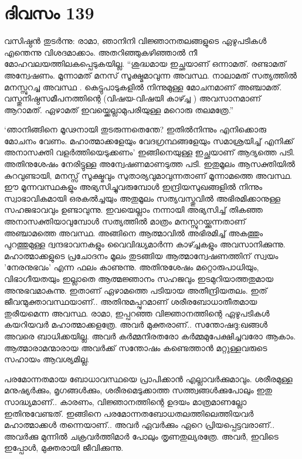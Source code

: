  
\section{ദിവസം 139}


വസിഷ്ഠൻ തുടർന്നു: രാമാ, ഞാനിനി വിജ്ഞാനതലങ്ങളുടെ ഏഴുപടികൾ എന്തെന്നു വിശദമാക്കാം. അതറിഞ്ഞുകഴിഞ്ഞാൽ നീ മോഹവലയത്തിലകപ്പെടുകയില്ല. “ശുദ്ധമായ ഇച്ഛയാണ്‌ ഒന്നാമത്. രണ്ടാമത് അന്വേഷണം. മൂന്നാമത് മനസ് സൂക്ഷ്മമാവുന്ന അവസ്ഥ. നാലാമത് സത്യത്തിൽ മനസ്സുറച്ച അവസ്ഥ . കെട്ടുപാടുകളിൽ നിന്നുമുള്ള മോചനമാണ്‌ അഞ്ചാമത്. വസ്തുനിഷ്ഠസമീപനത്തിന്റെ (വിഷയ-വിഷയി കാഴ്ച്ച ) അവസാനമാണ്‌ ആറാമത്. ഏഴാമത് ഇവയ്ക്കെല്ലാമുപരിയുള്ള മറൊരു തലമത്രേ.”

‘ഞാനിങ്ങിനെ മൂഢനായി തുടരുന്നതെന്തേ? ഇതില്‍നിന്നും എനിക്കൊരു മോചനം വേണം. മഹാത്മാക്കളേയും വേദഗ്രന്ഥങ്ങളേയും സമാശ്രയിച്ച് എനിക്ക് അനാസക്തി വളർത്തിയെടുക്കണം’ ഇങ്ങിനെയുള്ള ഇച്ഛയാണ്‌ ആദ്യത്തെ പടി. അതിനുശേഷം നേരിട്ടുള്ള അന്വേഷണമാണടുത്ത പടി. ഇതുമൂലം ആസക്തിയിൽ കുറവുണ്ടായി, മനസ്സ് സൂക്ഷ്മവും സുതാര്യവുമാവുന്നതാണ്‌ മൂന്നാമത്തെ അവസ്ഥ. ഈ മൂന്നവസ്ഥകളും അഭ്യസിച്ചുവരുമ്പോൾ ഇന്ദ്രിയസുഖങ്ങളിൽ നിന്നും സ്വാഭാവികമായി ഒരകൽച്ചയും അതുമൂലം സത്യവസ്തുവിൽ അഭിരമിക്കാനുള്ള സഹജഭാവവും ഉണ്ടാവുന്നു. ഇവയെല്ലാം നന്നായി അഭ്യസിച്ച് തികഞ്ഞ അനാസക്തിയാവുമ്പോൾ സത്യത്തിൽ മാത്രം മനസ്സുറയ്ക്കുന്നതാണ്‌ അഞ്ചാമത്തെ അവസ്ഥ. അങ്ങിനെ ആത്മാവിൽ അഭിരമിച്ച് അകത്തും പുറത്തുമുള്ള ദ്വന്ദഭാവനകളും വൈവിദ്ധ്യമാര്‍ന്ന  കാഴ്ച്ചകളും അവസാനിക്കുന്നു. മഹാത്മാക്കളുടെ പ്രചോദനം മൂലം തുടങ്ങിയ ആത്മാന്വേഷണത്തിന്‌ സ്വയം 'നേരനുഭവം' എന്ന ഫലം കാണുന്നു. അതിനുശേഷം മറ്റൊരുപാധിയും, വിഭാഗീയതയും ഇല്ലാതെ ആത്മജ്ഞാനം സഹജവും ഇടമുറിയാത്തതുമായ അനുഭവമാകുന്നു. ഇതാണ്‌ ഏഴാമത്തെ പടിയായ അതീന്ദ്രിയതലം. ഇത് ജീവന്മുക്താവസ്ഥയാണ്‌.. അതിനുമപ്പുറമാണ്‌ ശരീരബോധാതീതമായ തുരീയമെന്ന അവസ്ഥ. രാമാ, ഇപ്പറഞ്ഞ വിജ്ഞാനത്തിന്റെ ഏഴുപടികൾ കയറിയവർ മഹാത്മാക്കളത്രേ. അവർ മുക്തരാണ്‌.. സന്തോഷദു:ഖങ്ങൾ അവരെ ബാധിക്കയില്ല. അവർ കർമ്മനിരതരോ കർമ്മമുപേക്ഷിച്ചവരോ ആകാം. ആത്മാരാമന്മാരായ അവർക്ക് സന്തോഷം കണ്ടെത്താൻ മറ്റുള്ളവരുടെ സഹായം ആവശ്യമില്ല.

പരമോന്നതമായ ബോധാവസ്ഥയെ പ്രാപിക്കാൻ എല്ലാവർക്കുമാവും. ശരീരമുള്ള മനുഷ്യർക്കും, മൃഗങ്ങൾക്കും, ശരീരമെടുക്കാത്ത സത്ത്വങ്ങൾക്കുപോലും ഇതു സാദ്ധ്യമാണ്‌.. കാരണം, വിജ്ഞാനത്തിന്റെ ഉദയം മാത്രമാണല്ലോ ഇതിനുവേണ്ടത്. ഇങ്ങിനെ പരമോന്നതബോധതലത്തിലെത്തിയവർ മഹാത്മാക്കൾ തന്നെയാണ്‌.. അവർ ഏവര്‍ക്കും ഏറെ പ്രിയപ്പെട്ടവരാണ്‌.. അവർക്കു മുന്നിൽ ചക്രവർത്തിമാർ പോലും തൃണതുല്യരത്രേ. അവർ, ഇവിടെ ഇപ്പോൾ, മുക്തരായി ജീവിക്കുന്നു. 

